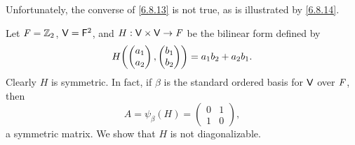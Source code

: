\begin{note}
  Unfortunately, the converse of \cref{6.8.13} is not true, as is illustrated by \cref{6.8.14}.
\end{note}

\begin{eg}\label{6.8.14}
  Let \(\mathit{F} = \mathbb{Z}_2\), \(\mathsf{V} = \mathsf{F}^2\), and \(H : \mathsf{V} \times \mathsf{V} \to \mathit{F}\) be the bilinear form defined by
  \[
    H\pa{\begin{pmatrix}
        a_1 \\
        a_2
      \end{pmatrix}, \begin{pmatrix}
        b_1 \\
        b_2
      \end{pmatrix}} = a_1 b_2 + a_2 b_1.
  \]
  Clearly \(H\) is symmetric.
  In fact, if \(\beta\) is the standard ordered basis for \(\mathsf{V}\) over \(\mathit{F}\), then
  \[
    A = \psi_{\beta}(H) = \begin{pmatrix}
      0 & 1 \\
      1 & 0
    \end{pmatrix},
  \]
  a symmetric matrix.
  We show that \(H\) is not diagonalizable.
\end{eg}

